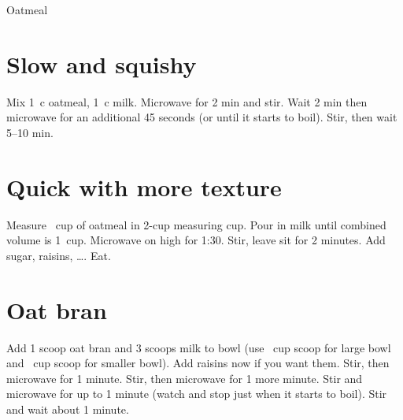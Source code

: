 
\begin{recipe}{Oatmeal}
  \maketitle

  \section{Slow and squishy}
  Mix 1~c oatmeal, 1\twothirds~c milk. Microwave for 2 min and stir. Wait 2
  min then microwave for an additional 45 seconds (or until it starts to
  boil). Stir, then wait 5--10 min.

  \section{Quick with more texture}
  Measure \twothirds~cup of oatmeal in 2-cup measuring {cup}. Pour in milk
  until combined volume is 1~cup. Microwave on high for 1:30. Stir, leave
  sit for 2 minutes. Add sugar, raisins, \dots. Eat.

  \section{Oat bran}
  Add 1 scoop oat bran and 3 scoops milk to bowl (use \third~cup scoop for
  large bowl and \fourth~cup scoop for smaller bowl). Add raisins now if
  you want them. Stir, then microwave for 1 minute. Stir, then microwave
  for 1 more minute. Stir and microwave for up to 1 minute (watch and stop
  just when it starts to boil). Stir and wait about 1 minute.
\end{recipe}

